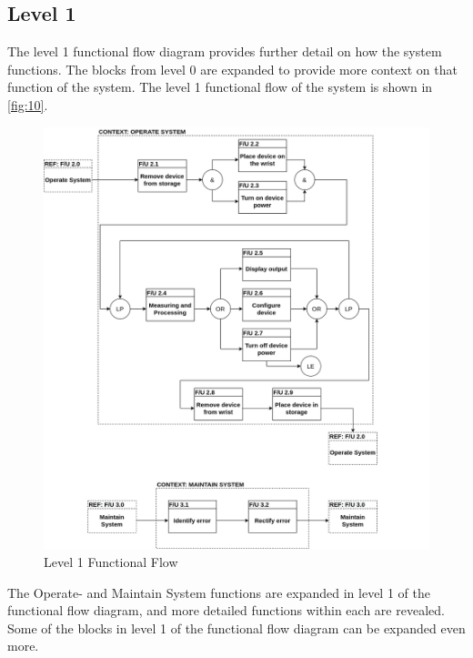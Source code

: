 \subsection{Level 1}
The level 1 functional flow diagram provides further detail on how the system functions. The blocks from level 0 are expanded to provide more context on that function of the system. The level 1 functional flow of the system is shown in \autoref{fig:10}.
\begin{figure}[H]
	\centering
	\includegraphics[scale=0.5]{img/L1FF}
	\caption{Level 1 Functional Flow}
	\label{fig:10}
\end{figure}
\noindent
The Operate- and Maintain System functions are expanded in level 1 of the functional flow diagram, and more detailed functions within each are revealed. Some of the blocks in level 1 of the functional flow diagram can be expanded even more. 

